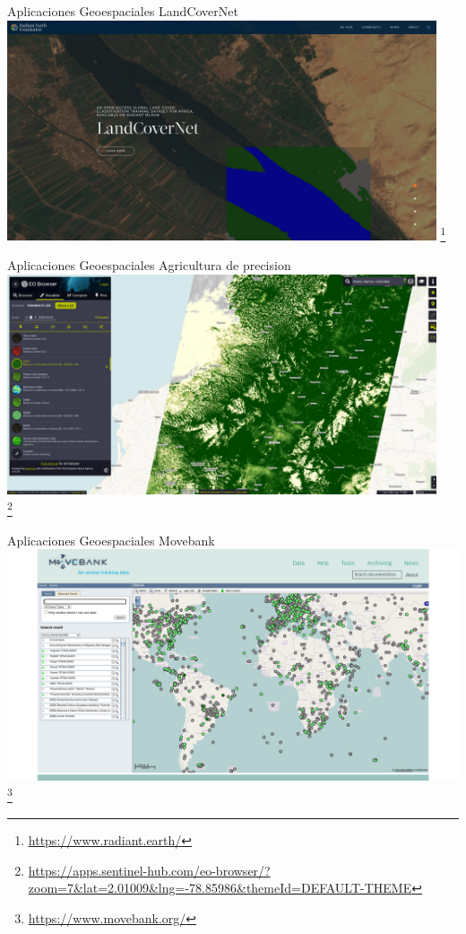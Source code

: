 \documentclass{beamer}
\newcommand\blfootnote[1]{%
  \begingroup
  \renewcommand\thefootnote{}\footnote{#1}%
  \addtocounter{footnote}{-1}%
  \endgroup
}
\begin{document}
\begin{frame}{Aplicaciones Geoespaciales}
    LandCoverNet
    \centering
    \includegraphics[width=0.95\textwidth]{figures/landcover}
    \blfootnote{\url{https://www.radiant.earth/}}
\end{frame}

\begin{frame}{Aplicaciones Geoespaciales}
    Agricultura de precision
    \centering
    \includegraphics[width=0.95\textwidth]{figures/sentinelhub}\\
    \blfootnote{\url{https://apps.sentinel-hub.com/eo-browser/?zoom=7&lat=2.01009&lng=-78.85986&themeId=DEFAULT-THEME}}
\end{frame}

\begin{frame}{Aplicaciones Geoespaciales}
    Movebank \hspace{5cm}
    \centering
    \includegraphics[width=\textwidth]{figures/movebank}\\
    \blfootnote{\url{https://www.movebank.org/}}
\end{frame}
\end{document}
